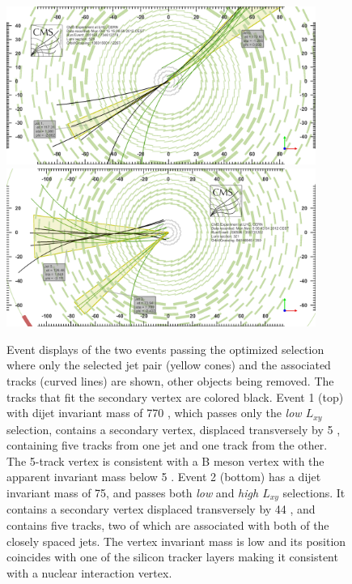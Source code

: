 \begin{figure}
\centering
\includegraphics[width=0.9\textwidth]{plots/displays/candidate1_display.png}
\includegraphics[width=0.9\textwidth]{plots/displays/candidate2_display.png}

\caption{Event displays of the two events passing the optimized selection where only the selected jet pair
 (yellow cones) and 
the associated tracks (curved lines) are shown, other objects being removed. The tracks that fit the secondary 
vertex are colored black.  
Event 1 (top) with dijet invariant mass of 770 \GeV, which 
passes only the {\it low $L_{xy}$} selection, 
contains a secondary vertex, displaced transversely by 5 \cm, containing five tracks from one jet and one track
from the other. The 5-track vertex is consistent with a B meson vertex with the apparent invariant mass below 5 \GeV.
Event 2 (bottom) has a dijet invariant mass of 75\GeV, 
and passes both {\it low} and {\it high $L_{xy}$} selections. It contains a secondary vertex
 displaced transversely by 44 \cm, and contains five tracks, two of which are
associated with both of the closely spaced jets. The vertex invariant mass is low and its position
 coincides with one of the silicon 
tracker layers making it consistent with a nuclear interaction vertex. 
\label{fig:eventDisplays}}
\end{figure} 



